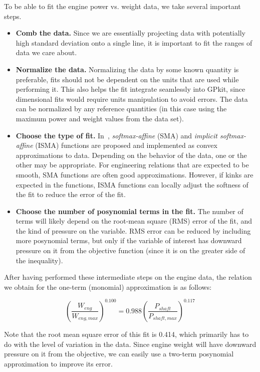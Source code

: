 To be able to fit the engine power vs. weight data, we take several important steps.
\begin{itemize}
    \item \textbf{Comb the data.} Since we are essentially projecting
    data with potentially high standard deviation onto a single line,
    it is important to fit the ranges of data we care about.
    \item \textbf{Normalize the data.} Normalizing the data
    by some known quantity is preferable, fits should not be dependent on the
    units that are used while performing it. This also helps the fit integrate
    seamlessly into GPkit, since dimensional fits would require units manipulation
    to avoid errors. The data can be normalized by any
    reference quantities (in this case using the maximum power and weight values
    from the data set).
    \item \textbf{Choose the type of fit.} In~\cite{gpfitpaper}, \textit{softmax-affine}
    (SMA) and \textit{implicit softmax-affine} (ISMA)
    functions are proposed and implemented as convex approximations
    to data. Depending on the behavior of the data, one or the other
    may be appropriate. For engineering relations that are expected to be smooth, SMA
    functions are often good approximations. However, if kinks are expected in the
    functions, ISMA functions can locally adjust the softness of the fit to
    reduce the error of the fit.
    \item \textbf{Choose the number of posynomial terms in the fit.} The number of
    terms will likely depend on the root-mean square (RMS) error of the fit, and
    the kind of pressure on the variable. RMS error can be reduced by including
    more posynomial terms, but only if the variable of interest has downward
    pressure on it from the objective function (since it is on the greater side
    of the inequality).
\end{itemize}

After having performed these intermediate steps on the engine data,
the relation we obtain for the one-term (monomial) approximation is as follows:

\begin{equation}
    \left(\frac{W_{eng}}{W_{eng,max}}\right)^{0.100} = 0.988 \left(\frac{P_{shaft}}{P_{shaft,max}}\right)^{0.117}
\end{equation}

Note that the root mean square error of this fit is 0.414, which primarily has to do with
the level of variation in the data. Since engine weight will have downward pressure
on it from the objective, we can easily use a two-term posynomial approximation to
improve its error.

